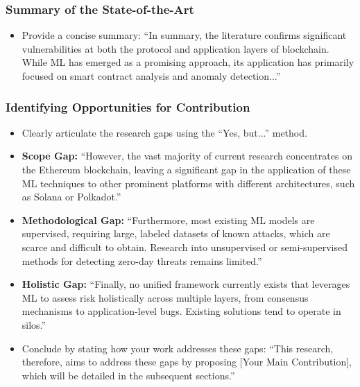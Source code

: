 	\subsubsection{Summary of the State-of-the-Art}
	\begin{itemize}
		\item Provide a concise summary: ``In summary, the literature confirms significant vulnerabilities at both the protocol and application layers of blockchain. While ML has emerged as a promising approach, its application has primarily focused on smart contract analysis and anomaly detection...''
	\end{itemize}
	
	\subsubsection{Identifying Opportunities for Contribution}
	\begin{itemize}
		\item Clearly articulate the research gaps using the ``Yes, but...'' method.
		\item \textbf{Scope Gap:} ``However, the vast majority of current research concentrates on the Ethereum blockchain, leaving a significant gap in the application of these ML techniques to other prominent platforms with different architectures, such as Solana or Polkadot.''
		\item \textbf{Methodological Gap:} ``Furthermore, most existing ML models are supervised, requiring large, labeled datasets of known attacks, which are scarce and difficult to obtain. Research into unsupervised or semi-supervised methods for detecting zero-day threats remains limited.''
		\item \textbf{Holistic Gap:} ``Finally, no unified framework currently exists that leverages ML to assess risk holistically across multiple layers, from consensus mechanisms to application-level bugs. Existing solutions tend to operate in silos.''
		\item Conclude by stating how your work addresses these gaps: ``This research, therefore, aims to address these gaps by proposing [Your Main Contribution], which will be detailed in the subsequent sections.''
	\end{itemize}